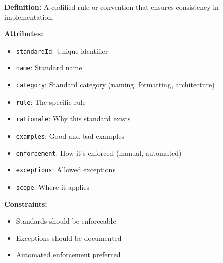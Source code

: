 \documentclass[11pt,letterpaper]{article}
\begin{document}
\begin{definitionbox}
\textbf{Definition:} A codified rule or convention that ensures consistency in implementation.

\textbf{Attributes:}
\begin{itemize}[nosep]
    \item \texttt{standardId}: Unique identifier
    \item \texttt{name}: Standard name
    \item \texttt{category}: Standard category (naming, formatting, architecture)
    \item \texttt{rule}: The specific rule
    \item \texttt{rationale}: Why this standard exists
    \item \texttt{examples}: Good and bad examples
    \item \texttt{enforcement}: How it's enforced (manual, automated)
    \item \texttt{exceptions}: Allowed exceptions
    \item \texttt{scope}: Where it applies
\end{itemize}

\textbf{Constraints:}
\begin{itemize}[nosep]
    \item Standards should be enforceable
    \item Exceptions should be documented
    \item Automated enforcement preferred
\end{itemize}
\end{definitionbox}
\end{document}
